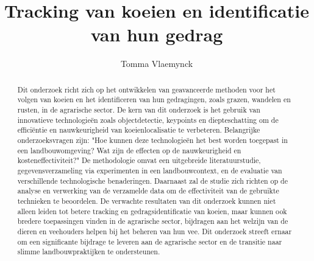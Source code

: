 \documentclass{hogent-article}
\title{Tracking van koeien en identificatie van hun gedrag}
\author{Tomma Vlaemynck}
\begin{document}
\begin{abstract}
  Dit onderzoek richt zich op het ontwikkelen van geavanceerde methoden voor het volgen van koeien en het identificeren van hun gedragingen, zoals grazen, wandelen en rusten, in de agrarische sector. De kern van dit onderzoek is het gebruik van innovatieve technologieën zoals objectdetectie, keypoints en diepteschatting om de efficiëntie en nauwkeurigheid van koeienlocalisatie te verbeteren. Belangrijke onderzoeksvragen zijn: "Hoe kunnen deze technologieën het best worden toegepast in een landbouwomgeving? Wat zijn de effecten op de nauwkeurigheid en kosteneffectiviteit?" De methodologie omvat een uitgebreide literatuurstudie, gegevensverzameling via experimenten in een landbouwcontext, en de evaluatie van verschillende technologische benaderingen. Daarnaast zal de studie zich richten op de analyse en verwerking van de verzamelde data om de effectiviteit van de gebruikte technieken te beoordelen. De verwachte resultaten van dit onderzoek kunnen niet alleen leiden tot betere tracking en gedragsidentificatie van koeien, maar kunnen ook bredere toepassingen vinden in de agrarische sector, bijdragen aan het welzijn van de dieren en veehouders helpen bij het beheren van hun vee. Dit onderzoek streeft ernaar om een significante bijdrage te leveren aan de agrarische sector en de transitie naar slimme landbouwpraktijken te ondersteunen.
\end{abstract}

\tableofcontents



\printbibliography[heading=bibintoc]
\end{document}

